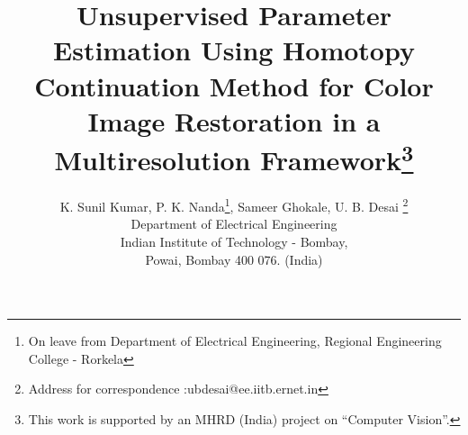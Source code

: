 \batchmode
{}
\makeatletter


\evensidemargin 0in
\oddsidemargin 0in
\topmargin 0in
\textwidth 6.25in
\headheight 0cm
\headsep 1cm
\textheight 9in
\footskip 0.5in
\footheight 1in
\columnsep 0.2in



















 



















\pagestyle{empty}
\typeout{   =====================================================}
\typeout{   =====================================================}

\title{Unsupervised Parameter Estimation Using Homotopy
Continuation Method for Color Image Restoration in a Multiresolution Framework\footnote{This work is supported by an MHRD (India) project on ``Computer Vision''. }}
\author{K. Sunil Kumar, P. K. Nanda\thanks{On leave from Department of Electrical Engineering, Regional Engineering College - Rorkela}, Sameer Ghokale,  U. B. Desai \thanks{Address for correspondence :ubdesai@ee.iitb.ernet.in}\\ [1ex]
Department of Electrical Engineering \\ 
Indian Institute of Technology - Bombay,\\ 
Powai, Bombay 400 076. (India)} 

\date{}
%

\newcommand {\DEF}{\stackrel{\Delta}{=}}

\newcommand {\ba}{\begin{abstract}}

